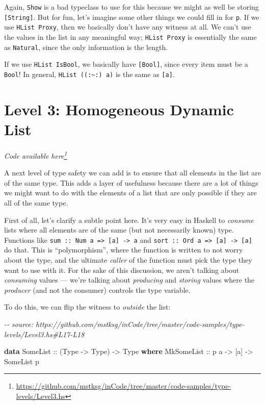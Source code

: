 \documentclass[]{article}
\newenvironment{Shaded}{}{}
\newcommand{\CommentTok}[1]{\textcolor[rgb]{0.38,0.63,0.69}{\textit{#1}}}
\newcommand{\DataTypeTok}[1]{\textcolor[rgb]{0.56,0.13,0.00}{#1}}
\newcommand{\KeywordTok}[1]{\textcolor[rgb]{0.00,0.44,0.13}{\textbf{#1}}}
\newcommand{\NormalTok}[1]{#1}
\newcommand{\OtherTok}[1]{\textcolor[rgb]{0.00,0.44,0.13}{#1}}
\renewcommand{\href}[2]{#2\footnote{\url{#1}}}
\begin{document}
Again, \texttt{Show} is a bad typeclass to use for this because we might as well
be storing \texttt{{[}String{]}}. But for fun, let's imagine some other things
we could fill in for \texttt{p}. If we use \texttt{HList\ Proxy}, then we
basically don't have any witness at all. We can't use the values in the list in
any meaningful way; \texttt{HList\ Proxy} is essentially the same as
\texttt{Natural}, since the only information is the length.

If we use \texttt{HList\ IsBool}, we basically have \texttt{{[}Bool{]}}, since
every item must be a \texttt{Bool}! In general,
\texttt{HList\ ((:\textasciitilde{}:)\ a)} is the same as \texttt{{[}a{]}}.

\section{Level 3: Homogeneous Dynamic
List}\label{level-3-homogeneous-dynamic-list}

\emph{\href{https://github.com/mstksg/inCode/tree/master/code-samples/type-levels/Level3.hs}{Code
available here}}

A next level of type safety we can add is to ensure that all elements in the
list are of the same type. This adds a layer of usefulness because there are a
lot of things we might want to do with the elements of a list that are only
possible if they are all of the same type.

First of all, let's clarify a subtle point here. It's very easy in Haskell to
\emph{consume} lists where all elements are of the same (but not necessarily
known) type. Functions like
\texttt{sum\ ::\ Num\ a\ =\textgreater{}\ {[}a{]}\ -\textgreater{}\ a} and
\texttt{sort\ ::\ Ord\ a\ =\textgreater{}\ {[}a{]}\ -\textgreater{}\ {[}a{]}} do
that. This is ``polymorphism'', where the function is written to not worry about
the type, and the ultimate \emph{caller} of the function must pick the type they
want to use with it. For the sake of this discussion, we aren't talking about
\emph{consuming} values --- we're talking about \emph{producing} and
\emph{storing} values where the \emph{producer} (and not the consumer) controls
the type variable.

To do this, we can flip the witness to \emph{outside} the list:

\begin{Shaded}
\begin{Highlighting}[]
\CommentTok{{-}{-} source: https://github.com/mstksg/inCode/tree/master/code{-}samples/type{-}levels/Level3.hs\#L17{-}L18}

\KeywordTok{data} \DataTypeTok{SomeList}\OtherTok{ ::}\NormalTok{ (}\DataTypeTok{Type} \OtherTok{{-}\textgreater{}} \DataTypeTok{Type}\NormalTok{) }\OtherTok{{-}\textgreater{}} \DataTypeTok{Type} \KeywordTok{where}
  \DataTypeTok{MkSomeList}\OtherTok{ ::}\NormalTok{ p a }\OtherTok{{-}\textgreater{}}\NormalTok{ [a] }\OtherTok{{-}\textgreater{}} \DataTypeTok{SomeList}\NormalTok{ p}
\end{Highlighting}
\end{Shaded}
\end{document}
